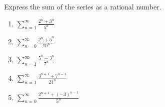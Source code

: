 Express the sum of the series as a rational number.
\begin{multicols}{2}
\begin{enumerate}[ref={\fcProblemRef}]
\item 
\label{problemSum(2^n+3^n)/(5^n)}
$
\displaystyle \sum\limits_{n=1}^{\infty} \frac{2^n+3^n}{5^n}
$


\item \label{problemsumn=0^infty(2^n+5^n)/10^n}
$\displaystyle\sum_{n=0}^{\infty} \frac{2^n+5^n}{10^n}$

\item \label{problemSum(3^n+5^n)/(7^n)}
$\displaystyle
\sum\limits_{n=1}^{\infty} \frac{5^n-3^n}{7^n}
$

\item \label{sum_n=1^infty(3^(n+1)+7^(n-1))/21^n}
$\displaystyle
\sum_{n=1}^\infty \frac{3^{n+1}+7^{n-1}}{21^n}
$
\item \label{sum_n=0^infty(2^(n+1)+(-3)^(n-1))/5^n}
$\displaystyle
\sum_{n=0}^\infty \frac{2^{n+1}+(-3)^{n-1}}{5^n}
$
\end{enumerate}
\end{multicols}